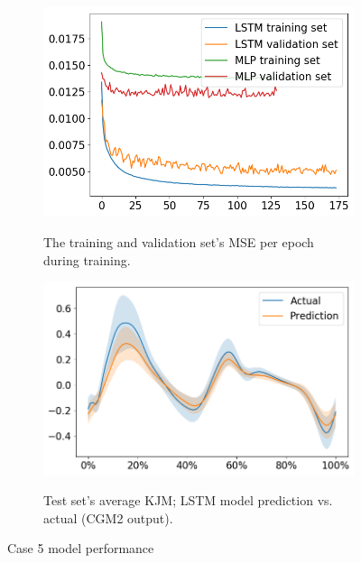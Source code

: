 \documentclass[../main.tex]{subfiles}
\begin{document}
\begin{figure}[ht!]
    \captionsetup[subfigure]{aboveskip=-12pt}
     \centering
     \begin{subfigure}[b]{0.475\textwidth}
         \centering
         \includegraphics[width=\textwidth]{img/results/training_history/Case5_LSTMvsMLP_training.png}
         \label{fig:case5-training-performance}
         \caption{The training and validation set's \ac{MSE} per epoch during training.}
     \end{subfigure}
     \hfill
     \begin{subfigure}[b]{0.515\textwidth}
         \centering
         \includegraphics[width=\textwidth]{img/results/test_prediction_evaluation/Case5_LSTM_test_prediction.png}
         \label{fig:case5-prediction-performance}
         \caption{Test set's average \ac{KJM}; LSTM model prediction vs. actual (CGM2 output).}
     \end{subfigure}
    \caption{Case 5 model performance}
    \label{fig:case5-performance-plots}
\end{figure}
\end{document}
